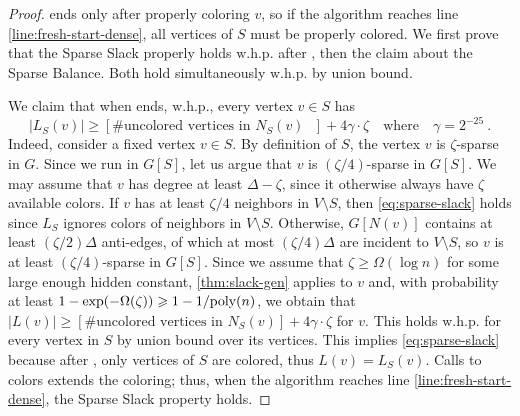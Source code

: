 \documentclass[a4paper,english,11pt]{amsart}
\theoremstyle{definition}
\renewcommand{\geq}{\geqslant}
\newcommand{\poly}{\mbox{\rm poly}}
\newcommand{\whp}{$\text{w.h.p.}$\xspace}
\newcommand{\NS}{N_{S}}
\newcommand{\LS}{L_{S}}
\begin{document}
\begin{proof}
     ends only after properly coloring $v$, so if the algorithm reaches line \ref{line:fresh-start-dense}, all vertices of $S$ must be properly colored. We first prove that the Sparse Slack properly holds \whp after \OneShotColoring, then the claim about the Sparse Balance. Both hold simultaneously \whp by union bound.

    We claim that when \OneShotColoring ends, \whp, every vertex $v\in S$ has
    \begin{equation}
        \label{eq:sparse-slack}
    |\LS(v)|
    \geq [\#\text{uncolored vertices in $\NS(v)$ }]
        + 4\gamma \cdot \zeta
        \quad\text{where}\quad
        \gamma = 2^{-25} \ .
    \end{equation}
    Indeed, consider a fixed vertex $v \in S$. By definition of $S$, the vertex $v$ is $\zeta$-sparse in $G$. Since we run \OneShotColoring in $G[S]$, let us argue that $v$ is $(\zeta/4)$-sparse in $G[S]$. We may assume that $v$ has degree at least $\Delta - \zeta$, since it otherwise always have $\zeta$ available colors. If $v$ has at least $\zeta/4$ neighbors in $V\setminus S$, then \cref{eq:sparse-slack} holds since $\LS$ ignores colors of neighbors in $V\setminus S$. Otherwise, $G[N(v)]$ contains at least $(\zeta/2)\Delta$ anti-edges, of which at most $(\zeta/4)\Delta$ are incident to $V \setminus S$, so $v$ is at least $(\zeta/4)$-sparse in $G[S]$. Since we assume that $\zeta \geq \Omega(\log n)$ for some large enough hidden constant, \cref{thm:slack-gen} applies to $v$ and, with probability at least $1 - \exp(-\Omega(\zeta)) \geq 1 - 1/\poly(n)$, we obtain that
    $
    |L(v)| \geq [\#\text{uncolored vertices in $\NS(v)$}] + 4\gamma \cdot \zeta
    $
    for $v$. This holds \whp for every vertex in $S$ by union bound over its vertices. This implies \cref{eq:sparse-slack} because after \OneShotColoring, only vertices of $S$ are colored, thus $L(v) = \LS(v)$. Calls to \RecolorSparse colors extends the coloring; thus, when the algorithm reaches line \ref{line:fresh-start-dense}, the Sparse Slack property holds.


\end{proof}
\end{document}

